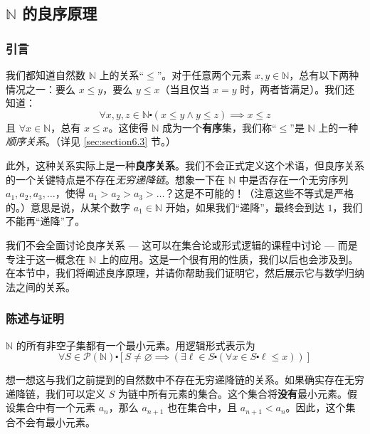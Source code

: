 \subsection{$\mathbb{N}$ 的良序原理} \label{sec:section5.5.2}

\subsubsection*{引言}

我们都知道自然数 $\mathbb{N}$ 上的关系``$\le$''。对于任意两个元素 $x, y \in \mathbb{N}$，总有以下两种情况之一：要么 $x \le y$，要么 $y \le x$（当且仅当 $x = y$ 时，两者皆满足）。我们还知道：
\[\forall x, y, z \in \mathbb{N} \centerdot (x \le y \land y \le z) \implies x \le z\]
且 $\forall x \in \mathbb{N}$，总有 $x \le x$。这使得 $\mathbb{N}$ 成为一个\textbf{有序}集，我们称``$\le$''是 $\mathbb{N}$ 上的一种\emph{顺序关系}。（详见 \ref{sec:section6.3} 节。）

此外，这种关系实际上是一种\textbf{良序关系}。我们不会正式定义这个术语，但良序关系的一个关键特点是不存在\emph{无穷递降链}。想象一下在 $\mathbb{N}$ 中是否存在一个无穷序列 $a_1, a_2, a_3, \dots$，使得 $a_1 > a_2 > a_3 > \dots$？这是不可能的！（注意这些不等式是严格的。）意思是说，从某个数字 $a_1 \in \mathbb{N}$ 开始，如果我们``递降''，最终会到达 $1$，我们不能再``递降''了。

我们不会全面讨论良序关系 --- 这可以在集合论或形式逻辑的课程中讨论 --- 而是专注于这一概念在 $\mathbb{N}$ 上的应用。这是一个很有用的性质，我们以后也会涉及到。在本节中，我们将阐述良序原理，并请你帮助我们证明它，然后展示它与数学归纳法之间的关系。

\subsubsection*{陈述与证明}

\begin{theorem}\label{theorem5.5.2}
    $\mathbb{N}$ 的所有非空子集都有一个最小元素。用逻辑形式表示为
    \[\forall S \in \mathcal{P}(\mathbb{N}) \centerdot [S \ne \varnothing \implies (\exists \ell \in S \centerdot (\forall x \in S \centerdot \ell \le x))]\]
\end{theorem}

想一想这与我们之前提到的自然数中不存在无穷递降链的关系。如果确实存在无穷递降链，我们可以定义 $S$ 为链中所有元素的集合。这个集合将\textbf{没有}最小元素。假设集合中有一个元素 $a_n$，那么 $a_{n+1}$ 也在集合中，且 $a_{n+1} < a_n$。因此，这个集合不会有最小元素。

